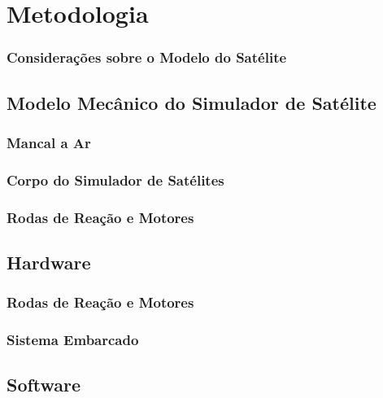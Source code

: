 \chapter{Metodologia}

\subsection{Considerações sobre o Modelo do Satélite}

\section{Modelo Mecânico do Simulador de Satélite}

\subsection{Mancal a Ar}

\subsection{Corpo do Simulador de Satélites}

\subsection{Rodas de Reação e Motores}

\section{Hardware}

\subsection{Rodas de Reação e Motores}

\subsection{Sistema Embarcado}

\section{Software}

